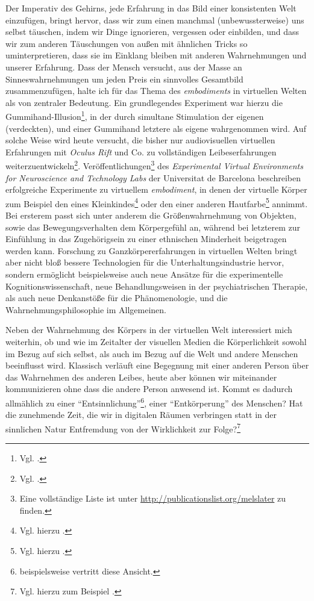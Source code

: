 \documentclass[a4paper]{article}
\begin{document}
Der Imperativ des Gehirns, jede Erfahrung in das Bild einer konsistenten Welt einzufügen, bringt hervor, dass wir zum einen manchmal (unbewussterweise) uns selbst täuschen, indem wir Dinge ignorieren, vergessen oder einbilden, und dass wir zum anderen Täuschung\-en von außen mit ähnlichen Tricks so uminterpretieren, dass sie im Einklang bleiben mit anderen Wahrnehmungen und unserer Erfahrung. Dass der Mensch versucht, aus der Masse an Sinneswahrnehmungen um jeden Preis ein sinnvolles Gesamtbild zusammenzufügen, halte ich für das Thema des \emph{embodiments} in virtuellen Welten als von zentraler Bedeutung. Ein grundlegendes Experiment war hierzu die Gummihand-Illusion\footnote{Vgl. .}, in der durch simultane Stimulation der eigenen (verdeckten), und einer Gummihand letztere als eigene wahrgenommen wird. Auf solche Weise wird heute versucht, die bisher nur audiovisuellen virtuellen Erfahrungen mit \emph{Oculus Rift} und Co. zu vollständigen Leibeserfahrungen weiterzuentwickeln\footnote{Vgl. .}. Veröffentlichungen\footnote{Eine vollständige Liste ist unter \url{http://publicationslist.org/melslater} zu finden.} des \emph{Experimental Virtual Environments for Neuroscience and Technology Labs} der Universitat de Barcelona beschreiben erfolgreiche Experimente zu virtuellem \emph{embodiment}, in denen der virtuelle Körper zum Beispiel den eines Kleinkindes\footnote{Vgl. hierzu .} oder den einer anderen Hautfarbe\footnote{Vgl. hierzu .} annimmt. Bei ersterem passt sich unter anderem die Größenwahrnehmung von Objekten, sowie das Bewegungsverhalten dem Körpergefühl an, während bei letzterem zur Einfühlung in das Zugehörigsein zu einer ethnischen Minderheit beigetragen werden kann. Forschung zu Ganzkörpererfahrungen in virtuellen Welten bringt aber nicht bloß bessere Technologien für die Unterhaltungsindustrie hervor, sondern ermöglicht beispielsweise auch neue Ansätze für die experimentelle Kognitionswissenschaft, neue Behandlungsweisen in der psychiatrischen Therapie, als auch neue Denkanstöße für die Phänomenologie, und die Wahrnehmungsphilosophie im Allgemeinen. 

Neben der Wahrnehmung des Körpers in der virtuellen Welt interessiert mich weiterhin, ob und wie im Zeitalter der visuellen Medien die Körperlichkeit sowohl im Bezug auf sich selbst, als auch im Bezug auf die Welt und andere Menschen beeinflusst wird. Klassisch verläuft eine Begegnung mit einer anderen Person über das Wahrnehmen des anderen Leibes, heute aber können wir miteinander kommunizieren ohne dass die andere Person anwesend ist. Kommt es dadurch allmählich zu einer "`Entsinnlichung"'\footnote{ beispielsweise vertritt diese Ansicht.}, einer "`Entkörperung"' des Menschen? Hat die zunehmende Zeit, die wir in digitalen Räumen verbringen statt in der sinnlichen Natur Entfremdung von der Wirklichkeit zur Folge?\footnote{Vgl. hierzu zum Beispiel .}   
\end{document}
